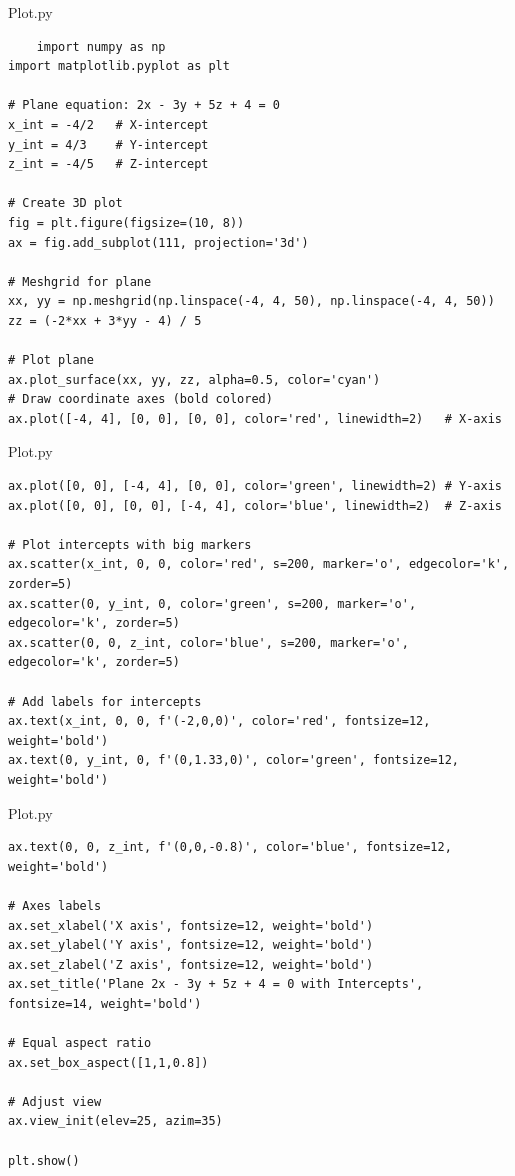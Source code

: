 \documentclass{beamer}
\begin{document}
\begin{frame}[fragile]{Plot.py}
\begin{lstlisting}
    import numpy as np
import matplotlib.pyplot as plt

# Plane equation: 2x - 3y + 5z + 4 = 0
x_int = -4/2   # X-intercept
y_int = 4/3    # Y-intercept
z_int = -4/5   # Z-intercept

# Create 3D plot
fig = plt.figure(figsize=(10, 8))
ax = fig.add_subplot(111, projection='3d')

# Meshgrid for plane
xx, yy = np.meshgrid(np.linspace(-4, 4, 50), np.linspace(-4, 4, 50))
zz = (-2*xx + 3*yy - 4) / 5

# Plot plane
ax.plot_surface(xx, yy, zz, alpha=0.5, color='cyan')
# Draw coordinate axes (bold colored)
ax.plot([-4, 4], [0, 0], [0, 0], color='red', linewidth=2)   # X-axis
\end{lstlisting}
\end{frame}

\begin{frame}[fragile]{Plot.py}
\begin{lstlisting}
ax.plot([0, 0], [-4, 4], [0, 0], color='green', linewidth=2) # Y-axis
ax.plot([0, 0], [0, 0], [-4, 4], color='blue', linewidth=2)  # Z-axis

# Plot intercepts with big markers
ax.scatter(x_int, 0, 0, color='red', s=200, marker='o', edgecolor='k', zorder=5)
ax.scatter(0, y_int, 0, color='green', s=200, marker='o', edgecolor='k', zorder=5)
ax.scatter(0, 0, z_int, color='blue', s=200, marker='o', edgecolor='k', zorder=5)

# Add labels for intercepts
ax.text(x_int, 0, 0, f'(-2,0,0)', color='red', fontsize=12, weight='bold')
ax.text(0, y_int, 0, f'(0,1.33,0)', color='green', fontsize=12, weight='bold')
\end{lstlisting}
\end{frame}

\begin{frame}[fragile]{Plot.py}
\begin{lstlisting}
ax.text(0, 0, z_int, f'(0,0,-0.8)', color='blue', fontsize=12, weight='bold')

# Axes labels
ax.set_xlabel('X axis', fontsize=12, weight='bold')
ax.set_ylabel('Y axis', fontsize=12, weight='bold')
ax.set_zlabel('Z axis', fontsize=12, weight='bold')
ax.set_title('Plane 2x - 3y + 5z + 4 = 0 with Intercepts', fontsize=14, weight='bold')

# Equal aspect ratio
ax.set_box_aspect([1,1,0.8])

# Adjust view
ax.view_init(elev=25, azim=35)

plt.show()
\end{lstlisting}
\end{frame}
\end{document}
